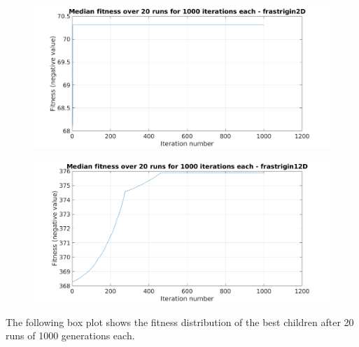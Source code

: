 \documentclass[paper=a4, fontsize=11pt]{scrartcl} %
\begin{document}
    \begin{figure}[H]
        \centering
        \begin{minipage}{.8\textwidth}
            \centering
            \includegraphics[width=.95\linewidth]{t3-funcMin-fitness-frastrigin2D}
            \label{fig:boxplot}
        \end{minipage}%
        \linebreak
        \begin{minipage}{.8\textwidth}
            \centering
            \includegraphics[width=.95\linewidth]{t3-funcMin-fitness-frastrigin12D}
            \label{fig:median}
        \end{minipage}
    \end{figure}

    The following box plot shows the fitness distribution of the best children after 20 runs of 1000 generations each.
\end{document}
